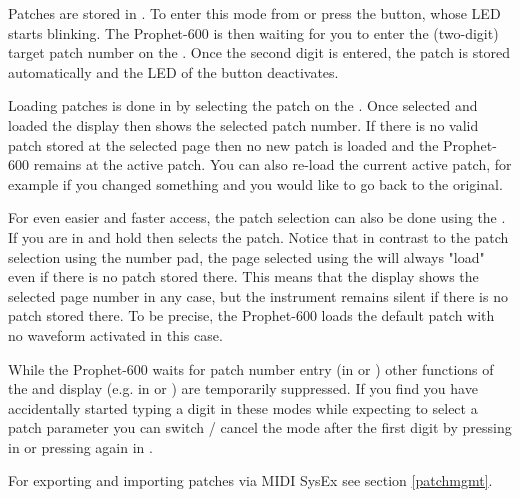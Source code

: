 Patches are stored in \storagemode. To enter this mode from \presetmode or \livemode press the \record button, whose LED starts blinking. The Prophet-600 is then waiting for you to enter the (two-digit) target patch number on the \termnumberpad. Once the second digit is entered, the patch is stored automatically and the LED of the \record button deactivates. 

Loading patches is done in \presetpatch by selecting the patch on the \termnumberpad. Once selected and loaded the display then shows the selected patch number. If there is no valid patch stored at the selected page then no new patch is loaded and the Prophet-600 remains at the active patch. You can also re-load the current active patch, for example if you changed something and you would like to go back to the original. 

For even easier and faster access, the patch selection can also be done using the \datadial. If you are in \presetmode and hold \fromtape then \datadial selects the patch. Notice that in contrast to the patch selection using the number pad, the page selected using the \datadial will always "load" even if there is no patch stored there. This means that the display shows the selected page number in any case, but the instrument remains silent if there is no patch stored there. To be precise, the Prophet-600 loads the default patch with no waveform activated in this case. 

While the Prophet-600 waits for patch number entry (in \storagemode or \presetpatch) other functions of the \termnumberpad and display (e.g. in \presetpanel or \livemode) are temporarily suppressed. If you find you have accidentally started typing a digit in these modes while expecting to select a patch parameter you can switch / cancel the mode after the first digit by pressing \totape in \presetpatch or pressing \record again in \storagemode.

For exporting and importing patches via MIDI SysEx see section \ref{patchmgmt}.
